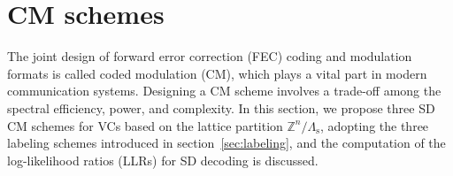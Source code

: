 \documentclass[journal]{IEEEtran}
\newcommand{\Z}{\mathbb{Z}}
\newcommand{\Lambdas}{\Lambda_\mathrm{s}}
\begin{document}
\section{CM schemes}\label{sec:CM}

The joint design of forward error correction (FEC) coding and modulation formats is called coded modulation (CM), which plays a vital part in modern communication systems. Designing a CM scheme involves a trade-off among the spectral efficiency, power, and complexity. In this section, we propose three SD CM schemes for VCs based on the lattice partition $\Z^n/\Lambdas$, adopting the three labeling schemes introduced in section~\ref{sec:labeling}, and the computation of the log-likelihood ratios (LLRs) for SD decoding is discussed.
\end{document}
